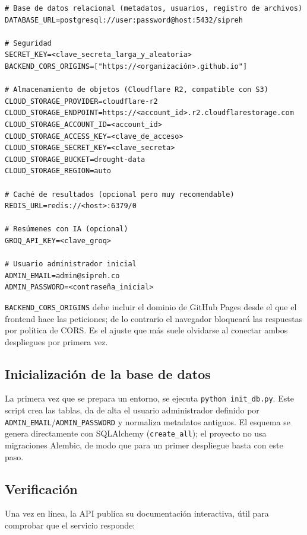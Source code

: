 \begin{verbatim}
# Base de datos relacional (metadatos, usuarios, registro de archivos)
DATABASE_URL=postgresql://user:password@host:5432/sipreh

# Seguridad
SECRET_KEY=<clave_secreta_larga_y_aleatoria>
BACKEND_CORS_ORIGINS=["https://<organización>.github.io"]

# Almacenamiento de objetos (Cloudflare R2, compatible con S3)
CLOUD_STORAGE_PROVIDER=cloudflare-r2
CLOUD_STORAGE_ENDPOINT=https://<account_id>.r2.cloudflarestorage.com
CLOUD_STORAGE_ACCOUNT_ID=<account_id>
CLOUD_STORAGE_ACCESS_KEY=<clave_de_acceso>
CLOUD_STORAGE_SECRET_KEY=<clave_secreta>
CLOUD_STORAGE_BUCKET=drought-data
CLOUD_STORAGE_REGION=auto

# Caché de resultados (opcional pero muy recomendable)
REDIS_URL=redis://<host>:6379/0

# Resúmenes con IA (opcional)
GROQ_API_KEY=<clave_groq>

# Usuario administrador inicial
ADMIN_EMAIL=admin@sipreh.co
ADMIN_PASSWORD=<contraseña_inicial>
\end{verbatim}

\begin{remark}
\texttt{BACKEND\_CORS\_ORIGINS} debe incluir el dominio de GitHub Pages desde el que el frontend hace las peticiones; de lo contrario el navegador bloqueará las respuestas por política de CORS. Es el ajuste que más suele olvidarse al conectar ambos despliegues por primera vez.
\end{remark}

\subsection{Inicialización de la base de datos}

La primera vez que se prepara un entorno, se ejecuta \texttt{python init\_db.py}. Este script crea las tablas, da de alta el usuario administrador definido por \texttt{ADMIN\_EMAIL}/\texttt{ADMIN\_PASSWORD} y normaliza metadatos antiguos. El esquema se genera directamente con SQLAlchemy (\texttt{create\_all}); el proyecto no usa migraciones Alembic, de modo que para un primer despliegue basta con este paso.

\subsection{Verificación}

Una vez en línea, la API publica su documentación interactiva, útil para comprobar que el servicio responde:

